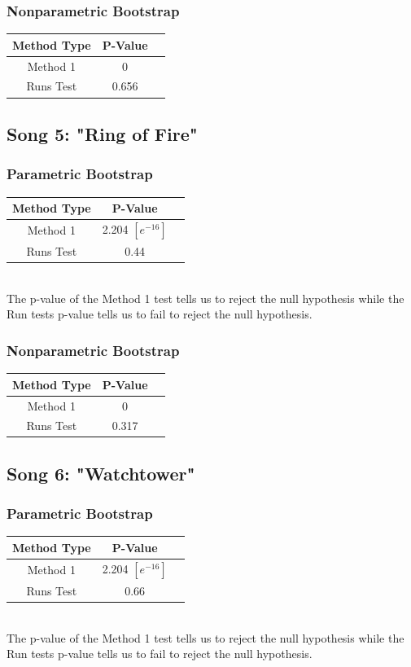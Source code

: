 \documentclass[12pt, letterpaper]{article}
\begin{document}
\subsubsection{Nonparametric Bootstrap}
\begin{tabular}{|c|c|c|}
\hline
\textbf{Method Type} & P-Value \\
\hline
Method 1 & 0  \\
\hline
Runs Test & 0.656 \\ 
\hline
\end{tabular}

\subsection{Song 5: "Ring of Fire"}
\subsubsection{Parametric Bootstrap}
\begin{tabular}{|c|c|c|}
\hline
\textbf{Method Type} & P-Value  \\
\hline
Method 1 & 2.204 $[e^{-16}]$ \\
\hline
Runs Test & 0.44 \\ 
\hline
\end{tabular} \\
The p-value of the Method 1 test tells us to reject the null hypothesis while the Run tests p-value tells us to fail to reject the null hypothesis.

\subsubsection{Nonparametric Bootstrap}
\begin{tabular}{|c|c|c|}
\hline
\textbf{Method Type} & P-Value \\
\hline
Method 1 & 0  \\
\hline
Runs Test & 0.317 \\ 
\hline
\end{tabular}

\subsection{Song 6: "Watchtower"}
\subsubsection{Parametric Bootstrap}
\begin{tabular}{|c|c|c|}
\hline
\textbf{Method Type} & P-Value  \\
\hline
Method 1 & 2.204 $[e^{-16}]$ \\
\hline
Runs Test & 0.66 \\ 
\hline
\end{tabular} \\
The p-value of the Method 1 test tells us to reject the null hypothesis while the Run tests p-value tells us to fail to reject the null hypothesis.
\end{document}
